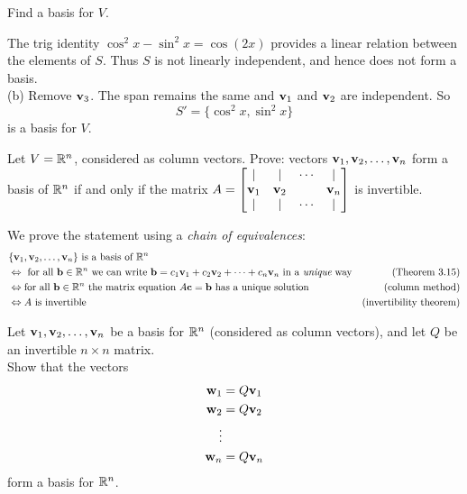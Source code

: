 \ii Find a basis for $V$.
\ee
\begin{solution}
\noindent The trig identity $\cos^2x - \sin^2x =\cos(2x)$ provides a linear relation between the elements of $S$. Thus $S$ is not linearly independent, and hence does not form a basis. 
\\
(b) 
Remove ${\mathbf v}_3$. The span remains the same and ${\mathbf v}_1$ and ${\mathbf v}_2$ are independent. So
$$
S'=\{\cos^2x,\sin^2x\}
$$
is a basis for $V$. 
\end{solution}

\ii Let $V={\mathbb R}^n$, considered as column vectors. 
Prove: vectors ${\mathbf v}_1,{\mathbf v}_2,\dots, {\mathbf v}_n$ form a basis of ${\mathbb R}^n$ if and only if the matrix $A=\begin{bmatrix}
\vert &\vert &\cdots &\vert\\
{\mathbf v}_1&{\mathbf v}_2& &{\mathbf v}_n\\
\vert &\vert &\cdots &\vert
\end{bmatrix}$
is invertible. 
\\
\begin{solution}
\noindent
We prove the statement using a {\em chain of equivalences}:
\begin{align*}
&\{{\mathbf v}_1, {\mathbf v}_2,\dots, {\mathbf v}_n\} \text{ is a basis of ${\mathbb R}^n$}\\
&\Leftrightarrow \text{ for all } {\mathbf b}\in {\mathbb R}^n \text{ we can write ${\mathbf b}=c_1{\mathbf v}_1+c_2{\mathbf v}_2+\cdots +c_n{\mathbf v}_n$ in a {\em unique} way} &\text{(Theorem 3.15)}\\
&\Leftrightarrow \text{for all ${\mathbf b}\in {\mathbb R}^n$ the matrix equation $A{\mathbf c}={\mathbf b}$ has a unique solution} &\text{(column method)}\\
&\Leftrightarrow \text{$A$ is invertible}&\text{(invertibility theorem)}
\end{align*}  
\end{solution}
\ii Let ${\mathbf v}_1,{\mathbf v}_2,\dots, {\mathbf v}_n$ be a basis for ${\mathbb R}^n$ (considered as column vectors), and let $Q$ be an invertible $n\times n$ matrix. 
\\ 
Show that the vectors 
\begin{align*}
{\mathbf w}_1&=Q{\mathbf v}_1\\ 
{\mathbf w}_2&=Q{\mathbf v}_2\\
\ \vdots \\
 {\mathbf w}_n&=Q{\mathbf v}_n
 \end{align*}
 form a basis for ${\mathbb R}^n$. 
\\
